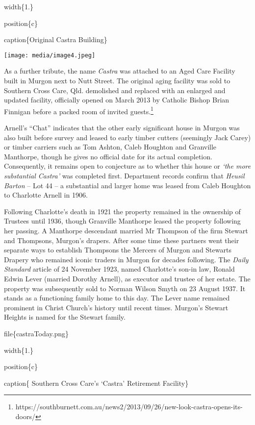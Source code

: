 width\{1.\}

position\{c\}

caption\{Original Castra Building\}

\texttt{[image: media/image4.jpeg]}

As a further tribute, the name \emph{Castra} was attached to an Aged Care Facility built in Murgon next to Nutt Street. The original aging facility was sold to Southern Cross Care, Qld. demolished and replaced with an enlarged and updated facility, officially opened on March 2013 by Catholic Bishop Brian Finnigan before a packed room of invited guests.\footnote{https://southburnett.com.au/news2/2013/09/26/new-look-castra-opens-its-doors/}

Arnell's ``Chat'' indicates that the other early significant house in Murgon was also built before survey and leased to early timber cutters (seemingly Jack Carey) or timber carriers such as Tom Ashton, Caleb Houghton and Granville Manthorpe, though he gives no official date for its actual completion. Consequently, it remains open to conjecture as to whether this house or \emph{`the more substantial Castra'} was completed first. Department records confirm that \emph{Heusil Barton} -- Lot 44 -- a substantial and larger home was leased from Caleb Houghton to Charlotte Arnell in 1906.

Following Charlotte's death in 1921 the property remained in the ownership of Trustees until 1936, though Granville Manthorpe leased the property following her passing. A Manthorpe descendant married Mr Thompson of the firm Stewart and Thompsons, Murgon's drapers. After some time these partners went their separate ways to establish Thompsons the Mercers of Murgon and Stewarts Drapery who remained iconic traders in Murgon for decades following. The \emph{Daily Standard} article of 24 November 1923, named Charlotte's son-in law, Ronald Edwin Lever (married Dorothy Arnell), as executor and trustee of her estate. The property was subsequently sold to Norman Wilson Smyth on 23 August 1937. It stands as a functioning family home to this day. The Lever name remained prominent in Christ Church's history until recent times. Murgon's Stewart Heights is named for the Stewart family.

file\{castraToday.png\}

width\{1.\}

position\{c\}

caption\{ Southern Cross Care's `Castra' Retirement Facility\}


